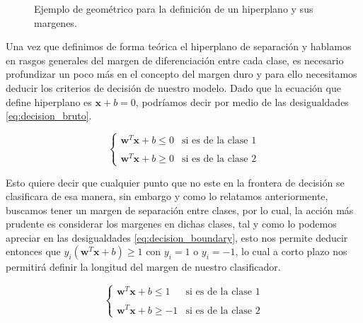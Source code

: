 \begin{figure}
	\caption{Ejemplo de geométrico para la definición de un hiperplano y sus margenes.}
	\label{fig:svm_nonlinear}
\end{figure}

Una vez que definimos de forma teórica el hiperplano de separación y hablamos en rasgos generales del margen de diferenciación entre cada clase, es necesario profundizar un poco más en el concepto del margen duro y para ello necesitamos deducir los criterios de decisión de nuestro modelo. Dado que la ecuación que define hiperplano es $\mathbf{x} + b=0$, podríamos decir por medio de las desigualdades \eqref{eq:decision_bruto}.

\begin{equation} \label{eq:decision_bruto}
	\begin{cases}
		\mathbf{w}^T \mathbf{x} + b \leq 0 & \text{si es de la clase 1} \\
		\\
		\mathbf{w}^T \mathbf{x} + b \geq 0 & \text{si es de la clase 2}
	\end{cases}
\end{equation}

Esto quiere decir que cualquier punto que no este en la frontera de decisión se clasificara de esa manera, sin embargo y como lo relatamos anteriormente, buscamos tener un margen de separación entre clases, por lo cual, la acción más prudente es considerar los margenes en dichas clases, tal y como lo podemos apreciar en las desigualdades \eqref{eq:decision_boundary}, esto nos permite deducir entonces que $y_i(\mathbf{w}^T \mathbf{x} + b)\geq 1$ con $y_i=1$ o $y_i=-1$, lo cual a corto plazo nos permitirá definir la longitud del margen de nuestro clasificador.

\begin{equation} \label{eq:decision_boundary}
	\begin{cases}
		\mathbf{w}^T \mathbf{x} + b \leq 1 & \text{si es de la clase 1} \\
		\\
		\mathbf{w}^T \mathbf{x} + b \geq -1 & \text{si es de la clase 2}
	\end{cases}
\end{equation}


